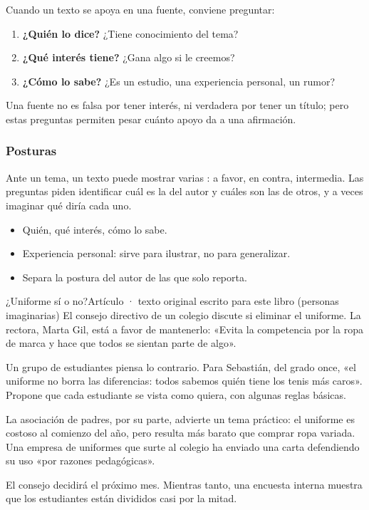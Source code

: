 Cuando un texto se apoya en una fuente, conviene preguntar:
\begin{enumerate}
  \item \textbf{¿Quién lo dice?} ¿Tiene conocimiento del tema?
  \item \textbf{¿Qué interés tiene?} ¿Gana algo si le creemos?
  \item \textbf{¿Cómo lo sabe?} ¿Es un estudio, una experiencia personal, un rumor?
\end{enumerate}
Una fuente no es falsa por tener interés, ni verdadera por tener un título; pero estas preguntas permiten pesar cuánto
apoyo da a una afirmación.

\subsubsection{Posturas}
Ante un tema, un texto puede mostrar varias : a favor, en contra, intermedia. Las preguntas piden
identificar cuál es la del autor y cuáles son las de otros, y a veces imaginar qué diría cada uno.


\begin{regla}
\begin{itemize}
  \item Quién, qué interés, cómo lo sabe.
  \item Experiencia personal: sirve para ilustrar, no para generalizar.
  \item Separa la postura del autor de las que solo reporta.
\end{itemize}
\end{regla}

\begin{texto}{¿Uniforme sí o no?}{Artículo · texto original escrito para este libro (personas imaginarias)}
\pa El consejo directivo de un colegio discute si eliminar el uniforme. La rectora, Marta Gil, está a favor de mantenerlo:
«Evita la competencia por la ropa de marca y hace que todos se sientan parte de algo».

\pa Un grupo de estudiantes piensa lo contrario. Para Sebastián, del grado once, «el uniforme no borra las diferencias:
todos sabemos quién tiene los tenis más caros». Propone que cada estudiante se vista como quiera, con algunas reglas
básicas.

\pa La asociación de padres, por su parte, advierte un tema práctico: el uniforme es costoso al comienzo del año, pero
resulta más barato que comprar ropa variada. Una empresa de uniformes que surte al colegio ha enviado una carta defendiendo
su uso «por razones pedagógicas».

\pa El consejo decidirá el próximo mes. Mientras tanto, una encuesta interna muestra que los estudiantes están divididos
casi por la mitad.
\end{texto}

